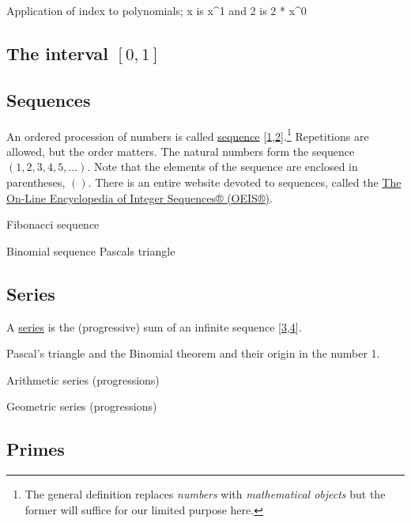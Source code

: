 \documentclass[
  a4paper,
]{article}
\begin{document}
Application of index to polynomials; x is x\^{}1 and 2 is 2 * x\^{}0

\hypertarget{the-interval-0-1}{%
\subsection{\texorpdfstring{The interval
\([0, 1]\)}{The interval {[}0, 1{]}}}\label{the-interval-0-1}}

\hypertarget{sequences}{%
\subsection{Sequences}\label{sequences}}

An ordered procession of numbers is called
\href{https://en.wikipedia.org/w/index.php?title=Sequence\&oldid=1177801065}{sequence}
{[}\protect\hyperlink{ref-wikisequence}{1},\protect\hyperlink{ref-wolframsequence}{2}{]}.\footnote{The
  general definition replaces \emph{numbers} with \emph{mathematical
  objects} but the former will suffice for our limited purpose here.}
Repetitions are allowed, but the order matters. The natural numbers form
the sequence \((1, 2, 3, 4, 5, \ldots)\). Note that the elements of the
sequence are enclosed in parentheses, \(()\). There is an entire website
devoted to sequences, called the \href{https://oeis.org/}{The On-Line
Encyclopedia of Integer Sequences® (OEIS®)}.

Fibonacci sequence

Binomial sequence Pascals triangle

\hypertarget{series}{%
\subsection{Series}\label{series}}

A \href{https://mathworld.wolfram.com/Series.html}{series} is the
(progressive) sum of an infinite sequence
{[}\protect\hyperlink{ref-wikiseries}{3},\protect\hyperlink{ref-wolframseries}{4}{]}.

Pascal's triangle and the Binomial theorem and their origin in the
number 1.

Arithmetic series (progressions)

Geometric series (progressions)

\hypertarget{primes}{%
\subsection{Primes}\label{primes}}
\end{document}
